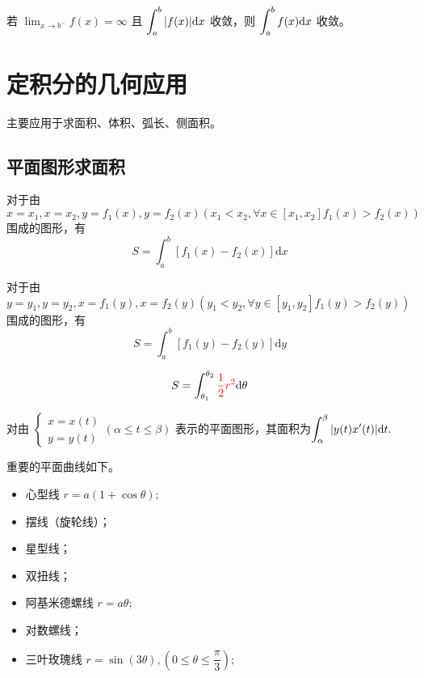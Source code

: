\begin{Theo}[绝对收敛必收敛]

    若 $ {\displaystyle\lim_{x\rightarrow b^-}}f(x)=\infty $ 且 $ \displaystyle \int_a^{b}|f(x)|\mathrm{d}x $ 收敛，则
    $ \displaystyle \int_a^{b}f(x)\mathrm{d}x $ 收敛。
\end{Theo}

\section{定积分的几何应用}

主要应用于求面积、体积、弧长、侧面积。

\subsection{平面图形求面积}


对于由 $ x = x_1, x = x_2,y = f_1(x), y = f_2(x) (x_1 < x_2,\forall x \in [x_1,x_2]f_1(x) > f_2(x)) $ 
围成的图形，有 $$
    S = \int_a^b[f_1(x)-f_2(x)]\mathrm{d}x
$$ 

对于由 $ y = y_1, y = y_2,x = f_1(y), x = f_2(y) (y_1 < y_2,\forall y \in [y_1,y_2]f_1(y) > f_2(y)) $ 
围成的图形，有 $$
    S = \int_a^b[f_1(y)-f_2(y)]\mathrm{d}y
$$ 


$$
    S = \int_{\theta_1}^{\theta_2}\textcolor{red}{\dfrac{1}{2}r^2}\mathrm{d}\theta
$$ 


对由 $ \begin{cases}
    x = x(t) \\ y = y(t)
\end{cases} (\alpha\leq t\leq \beta) $ 表示的平面图形，其面积为$\displaystyle\int_\alpha^\beta |y(t)x'(t)|\mathrm{d}t. $


重要的平面曲线如下。
\begin{itemize}
    \item 心型线 $ r = a(1+\cos\theta) ; $
    \item 摆线（旋轮线）；
    \item 星型线；
    \item 双扭线；
    \item 阿基米德螺线 $ r = a\theta ; $
    \item 对数螺线；
    \item 三叶玫瑰线 $ r = \sin(3\theta),(0\leq\theta\leq \dfrac{\pi}{3}) ; $
\end{itemize}

